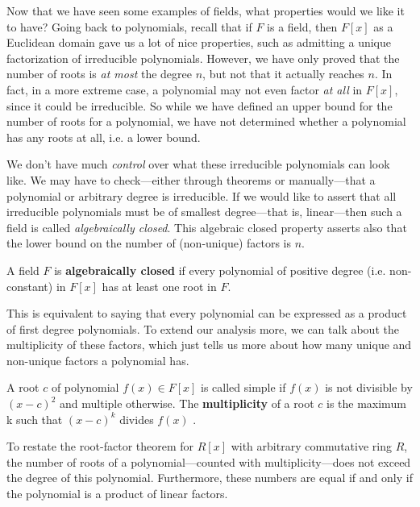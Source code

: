   Now that we have seen some examples of fields, what properties would we like it to have? Going back to polynomials, recall that if $F$ is a field, then $F[x]$ as a Euclidean domain gave us a lot of nice properties, such as admitting a unique factorization of irreducible polynomials. However, we have only proved that the number of roots is \textit{at most} the degree $n$, but not that it actually reaches $n$. In fact, in a more extreme case, a polynomial may not even factor \textit{at all} in $F[x]$, since it could be irreducible. So while we have defined an upper bound for the number of roots for a polynomial, we have not determined whether a polynomial has any roots at all, i.e. a lower bound. 

  We don't have much \textit{control} over what these irreducible polynomials can look like. We may have to check---either through theorems or manually---that a polynomial or arbitrary degree is irreducible. If we would like to assert that all irreducible polynomials must be of smallest degree---that is, linear---then such a field is called \textit{algebraically closed}. 
  This algebraic closed property asserts also that the lower bound on the number of (non-unique) factors is $n$. 

  \begin{definition}
    A field $F$ is \textbf{algebraically closed} if every polynomial of positive degree (i.e. non-constant) in $F[x]$ has at least one root in $F$. 
  \end{definition}

  This is equivalent to saying that every polynomial can be expressed as a product of first degree polynomials. To extend our analysis more, we can talk about the multiplicity of these factors, which just tells us more about how many unique and non-unique factors a polynomial has. 

  \begin{definition}[Multiplicity]
    A root $c$ of polynomial $f(x) \in F[x]$ is called simple if $f(x)$ is not divisible by $(x - c)^2$ and multiple otherwise. The \textbf{multiplicity} of a root $c$ is the maximum k such that $(x - c)^k$ divides $f(x)$ .
  \end{definition} 

  To restate the root-factor theorem for $R[x]$ with arbitrary commutative ring $R$, the number of roots of a polynomial---counted with multiplicity---does not exceed the degree of this polynomial. Furthermore, these numbers are equal if and only if the polynomial is a product of linear factors.


